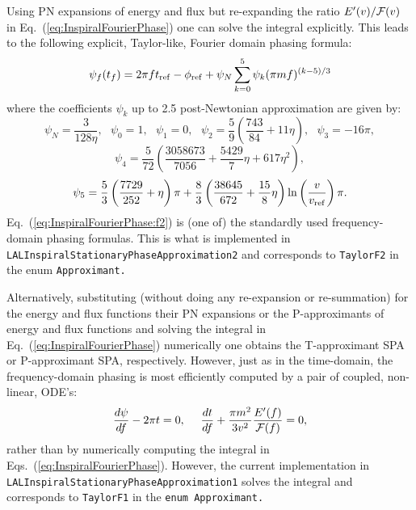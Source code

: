 Using PN expansions of energy and flux but
re-expanding the ratio $E'(v)/{\cal F}(v)$ in Eq.~(\ref{eq:InspiralFourierPhase}) one
can solve the integral explicitly. This leads to the following
explicit, Taylor-like, Fourier domain phasing formula:
\begin{equation}
 \psi_f(t_f) = 2 \pi f t_{\rm ref} - \phi_{\rm ref} +
 \psi_N \sum_{k=0}^5 {\psi}_k (\pi m f)^{(k-5)/3}
\label{eq:InspiralFourierPhase:f2}
\end{equation}
where the coefficients ${\psi}_k$ up to 2.5 post-Newtonian approximation are given by:
$$\psi_N =  \frac{3}{128\eta},\ \ \ \psi_0 = 1,\ \ \ \psi_1 = 0,\ \ \
\psi_2 =  \frac{5}{9} \left ( \frac{743}{84} + 11\eta\right ),\ \ \
\psi_3 =  -16\pi,$$
$$\psi_4 = \frac{5}{72}\left(\frac{3058673}{7056} + \frac{5429}{7}\eta +
617\eta^2\right),$$
$$\psi_5 =  \frac{5}{3} \left ( \frac{7729}{252} + \eta \right ) \pi +
   \frac{8}{3} \left ( \frac{38645}{672} + \frac{15}{8} \eta \right )
	\ln \left ( \frac{v}{v_{\rm ref}} \right )\pi.$$
Eq.~(\ref{eq:InspiralFourierPhase:f2}) is (one of) the  standardly used frequency-domain phasing formulas.
This is what is implemented in {\tt LALInspiralStationaryPhaseApproximation2}
and corresponds to \texttt{TaylorF2} in the enum \texttt{Approximant.}

Alternatively, substituting (without doing any re-expansion or re-summation)
for the energy and flux functions their PN expansions
or the P-approximants of energy and flux functions
and solving the integral in Eq.~(\ref{eq:InspiralFourierPhase}) numerically
one obtains the T-approximant SPA or P-approximant SPA, respectively.
However, just as in the time-domain, the frequency-domain phasing is
most efficiently computed by a pair of coupled, non-linear, ODE's:
\begin{equation}
\frac{d\psi}{df} - 2\pi t = 0, \ \ \ \
\frac{dt}{df} + \frac{\pi m^2}{3v^2} \frac{E'(f)}{{\cal F}(f)} = 0,
\label {eq:frequencyDomainODE}
\end{equation}
rather  than by numerically computing the integral in
Eqs.~(\ref{eq:InspiralFourierPhase}).  However, the current implementation
in {\tt LALInspiralStationaryPhaseApproximation1} solves the integral
and corresponds to \texttt{TaylorF1} in the  \texttt{enum Approximant.}

